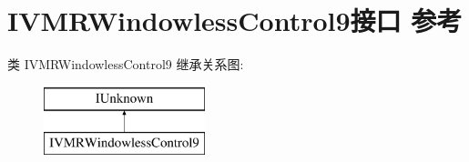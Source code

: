 \hypertarget{interface_i_v_m_r_windowless_control9}{}\section{I\+V\+M\+R\+Windowless\+Control9接口 参考}
\label{interface_i_v_m_r_windowless_control9}
类 I\+V\+M\+R\+Windowless\+Control9 继承关系图\+:\begin{figure}[H]
\begin{center}
\leavevmode
\includegraphics[height=2.000000cm]{interface_i_v_m_r_windowless_control9}
\end{center}
\end{figure}

